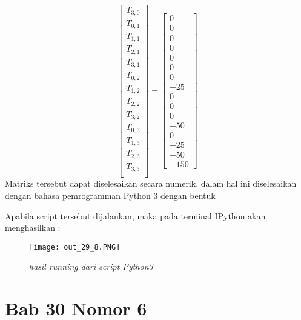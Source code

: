 \documentclass[a4paper,12pt]{article}
\numberwithin{equation}{section} %
\begin{document}
\begin{equation}
\begin{bmatrix}
T_{3,0}\\ 
T_{0,1}\\ 
T_{1,1}\\ 
T_{2,1}\\ 
T_{3,1}\\
T_{0,2}\\ 
T_{1,2}\\ 
T_{2,2}\\ 
T_{3,2}\\
T_{0,3}\\ 
T_{1,3}\\ 
T_{2,3}\\ 
T_{3,3}\\
\end{bmatrix}
=
\begin{bmatrix}
0\\ 
0\\ 
0\\ 
0\\ 
0\\ 
0\\ 
0\\ 
-25\\ 
0\\ 
0\\ 
0\\ 
-50\\ 
0\\ 
-25\\ 
-50\\
-150
\end{bmatrix}
\end{equation}
Matriks tersebut dapat diselesaikan secara numerik, dalam hal ini diselesaikan dengan bahasa pemrogramman Python 3 dengan bentuk


Apabila script tersebut dijalankan, maka pada terminal IPython akan menghasilkan :
\begin{figure}[h]
	\centering
	\caption{\textit{hasil running dari script Python3}}
	\texttt{[image: out\_29\_8.PNG]}
\end{figure}

\newpage
\section{Bab 30 Nomor 6}
\end{document}
